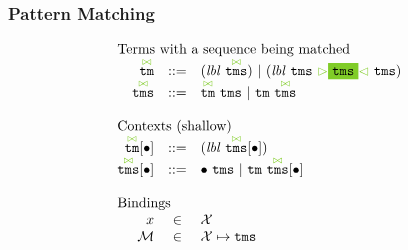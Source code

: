 \documentclass{article}
\newcommand{\cursorColor}{LimeGreen}
\newcommand{\lbl}{\ensuremath{\mathit{lbl}}}
\newcommand{\lbls}{\ensuremath{\mathit{lbls}}}
\newcommand{\tm}{\ensuremath{\mathtt{tm}}}
\newcommand{\tms}{\ensuremath{\mathtt{tms}}}
\newcommand{\Tmc}{\ensuremath{\overset{ \textcolor{\cursorColor}{\bowtie}}{\tm}}}
\newcommand{\Tmcs}{\ensuremath{\overset{\textcolor{\cursorColor}{\bowtie}}{\tms}}}
\newcommand{\mstart}{\ensuremath{\textcolor{\cursorColor}{\rhd}}}
\newcommand{\mend}{\ensuremath{\textcolor{\cursorColor}{\lhd}}}
\newcommand{\bindings}{\ensuremath{\mathcal{M}}}
\newcommand{\select}[1]{\mstart\colorbox{\cursorColor}{$#1$}\mend}
\newcommand{\por}[2]{\ensuremath{#1/#2}}
\newcommand{\pnot}[1]{\ensuremath{\lnot #1}}
\newcommand{\any}{\ensuremath{\text{\underline{\hspace{0.6em}}}}}
\newcommand{\fb}[1]{\ensuremath{\mathop{\rightarrow}(#1)}}
\newcommand{\pin}[1]{\ensuremath{\mathit{In}(#1)}}
\newcommand{\pstart}{\ensuremath{\mathit{Start}}}
\newcommand{\pend}{\ensuremath{\mathit{End}}}
\newcommand{\arrayheading}[2]{\multicolumn{#1}{l}{\mbox{#2}}}
\begin{document}
\subsubsection{Pattern Matching}

\[
  \begin{array}{rcl}
    \arrayheading{3}{Terms with a sequence being matched}\\
    \Tmc & ::= & (\lbl~\Tmcs) ~|~ (\lbl~\tms~\select{\tms}~\tms)\\
    \Tmcs & ::= & \Tmc ~ \tms ~|~ \tm ~ \Tmcs\\
    \\
    \arrayheading{3}{Contexts (shallow)}\\
    \Tmc[\bullet] & ::= & (\lbl~\Tmcs[\bullet])\\
    \Tmcs[\bullet] & ::= & \bullet ~ \tms ~|~ \tm ~ \Tmcs[\bullet]\\
    \\
    \arrayheading{3}{Bindings}\\
    x         & \in & \mathcal{X}\\
    \bindings & \in & \mathcal{X} \mapsto \tms\\

\end{array}\]
\end{document}

